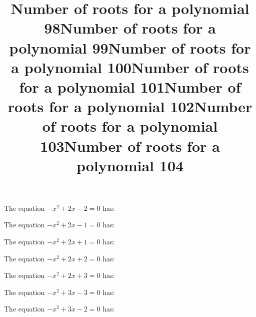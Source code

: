 \documentclass{article}
\begin{document}
\begin{category}
\begin{question}[multichoice]
\end{question}
\begin{question}[multichoice]
\title{Number of roots for a polynomial 98}
The equation $- x^{2} + 2 x - 2=0$ has:


\end{question}
\begin{question}[multichoice]
\title{Number of roots for a polynomial 99}
The equation $- x^{2} + 2 x - 1=0$ has:


\end{question}
\begin{question}[multichoice]
\title{Number of roots for a polynomial 100}
The equation $- x^{2} + 2 x + 1=0$ has:


\end{question}
\begin{question}[multichoice]
\title{Number of roots for a polynomial 101}
The equation $- x^{2} + 2 x + 2=0$ has:


\end{question}
\begin{question}[multichoice]
\title{Number of roots for a polynomial 102}
The equation $- x^{2} + 2 x + 3=0$ has:


\end{question}
\begin{question}[multichoice]
\title{Number of roots for a polynomial 103}
The equation $- x^{2} + 3 x - 3=0$ has:


\end{question}
\begin{question}[multichoice]
\title{Number of roots for a polynomial 104}
The equation $- x^{2} + 3 x - 2=0$ has:


\end{question}
\end{category}
\end{document}
